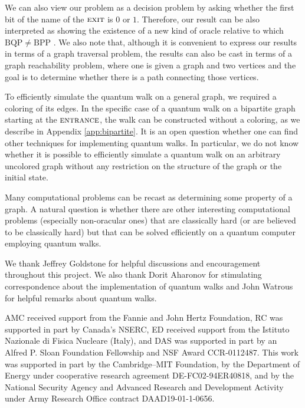 \documentclass[aps,11pt,twoside,nofootinbib,tightenlines,superscriptaddress,preprintnumbers]{revtex4}
\newcommand{\<}{\langle}
\renewcommand{\>}{\rangle}
\newcommand{\BPP}{{\mathrm{BPP}}}
\newcommand{\BQP}{{\mathrm{BQP}}}
\newcommand{\ent}{{\textsc{entrance}}}
\newcommand{\exit}{{\textsc{exit}}}
\begin{document}
We can also view our problem as a decision problem by asking whether the
first bit of the name of the $\exit$ is $0$ or $1$.  Therefore, our result
can be also interpreted as showing the existence of a new kind of oracle
relative to which $\BQP \neq \BPP$ \cite{BV93,Sim94}.  We also note that,
although it is convenient to express our results in terms of a graph
traversal problem, the results can also be cast in terms of a graph
reachability problem, where one is given a graph and two vertices and the
goal is to determine whether there is a path connecting those vertices.

To efficiently simulate the quantum walk on a general graph, we required a
coloring of its edges.  In the specific case of a quantum walk on a
bipartite graph starting at the $\ent$, the walk can be constructed
without a coloring, as we describe in Appendix \ref{app:bipartite}.  It is
an open question whether one can find other techniques for implementing
quantum walks.  In particular, we do not know whether it is possible to
efficiently simulate a quantum walk on an arbitrary uncolored graph
without any restriction on the structure of the graph or the initial
state.

Many computational problems can be recast as determining some property of
a graph.  A natural question is whether there are other interesting
computational problems (especially non-oracular ones) that are classically
hard (or are believed to be classically hard) but that can be solved
efficiently on a quantum computer employing quantum walks.

\acknowledgments

We thank Jeffrey Goldstone for helpful discussions and encouragement
throughout this project. We also thank Dorit Aharonov for stimulating
correspondence about the implementation of quantum walks and John Watrous
for helpful remarks about quantum walks.

AMC received support from the Fannie and John Hertz Foundation, RC was
supported in part by Canada's NSERC, ED received support from the
Istituto Nazionale di Fisica Nucleare (Italy), and DAS was supported in
part by an Alfred P. Sloan Foundation Fellowship and NSF Award
CCR-0112487.
%
This work was supported in part by the Cambridge--MIT Foundation, by the
Department of Energy under cooperative research agreement
DE-FC02-94ER40818, and by the National Security Agency and Advanced
Research and Development Activity under Army Research Office contract
DAAD19-01-1-0656.
\end{document}
